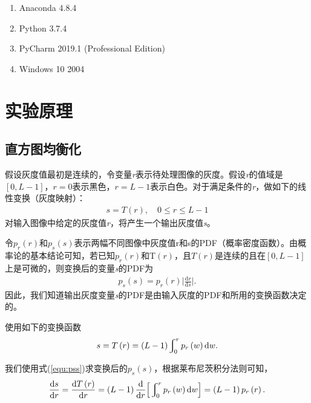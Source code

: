 \documentclass{hitreport}
\begin{document}
\begin{enumerate}
\item Anaconda 4.8.4
\item Python 3.7.4
\item PyCharm 2019.1 (Professional Edition)
\item Windows 10 2004
\end{enumerate}

\section{实验原理}

\subsection{直方图均衡化}\label{sec:junhenghua}

假设灰度值最初是连续的，令变量\textit{r}表示待处理图像的灰度。假设\textit{r}的值域是$\left[0,L-1\right]$，$r=0$表示黑色，$r=L-1$表示白色。对于满足条件的\textit{r}，做如下的线性变换（灰度映射）：
\begin{align}
s=T\left(r\right),\quad 0\le r\le L-1
\end{align}
对输入图像中给定的灰度值\textit{r}，将产生一个输出灰度值\textit{s}。

令$p_r\left(r\right)$和$p_s\left(s\right)$表示两幅不同图像中灰度值r和s的PDF（概率密度函数）。由概率论的基本结论可知，若已知$p_r\left(r\right)$和T$\left(r\right)$，且$T\left(r\right)$是连续的且在$\left[0,L-1\right]$上是可微的，则变换后的变量\textit{s}的PDF为
\begin{align}\label{equ:pss}
p_s\left(s\right)=p_r\left(r\right)\Big|\frac{\mathrm{d}r}{\mathrm{d}s}\Big|.
\end{align}
因此，我们知道输出灰度变量\textit{s}的PDF是由输入灰度的PDF和所用的变换函数决定的。

使用如下的变换函数
\begin{align}\label{equ:trans}
s=T\left(r\right)=\left(L-1\right)\varint\nolimits_{0}^{r}p_r\left(w\right)\mathrm{d}w.
\end{align}

我们使用式(\ref{equ:pss})求变换后的$p_s\left(s\right)$，根据莱布尼茨积分法则可知，
\begin{align}
\frac{\mathrm{d}s}{\mathrm{d}r} = \frac{\mathrm{d} T\left(r\right)}{\mathrm{d}r} = \left(L-1\right)\frac{\mathrm{d}}{\mathrm{d}r}\Big[\varint\nolimits_{0}^{r}p_r\left(w\right)\mathrm{d}w\Big] = \left(L-1\right)p_r\left(r\right).
\end{align}
\end{document}
